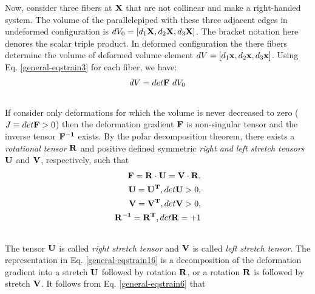 \documentclass[letterpaper,10pt,english]{sphinxmanual}
\begin{document}
Now, consider three fibers at ${\bf X}$ that are not collinear and make a right-handed system. The volume of the parallelepiped with these three adjacent edges in undeformed configuration is $dV_0=[d_1{\bf X}, d_2{\bf X}, d_3{\bf X}]$. The bracket notation here denores the scalar triple product. In deformed configuration the there fibers determine the volume of deformed volume element $dV=[d_1{\bf x}, d_2{\bf x}, d_3{\bf x}]$. Using Eq. \eqref{general-eqstrain3} for each fiber, we have:
\begin{gather}
\begin{split}dV = det{\bf F}~dV_0\end{split}\notag\\\begin{split}\end{split}\notag
\end{gather}
If consider only deformations for which the volume is never decreased to zero ($J \equiv det{\bf F} > 0$) then the deformation gradient ${\bf F}$ is non-singular tensor and the inverse tensor ${\bf F^{-1}}$ exists. By the polar decomposition theorem, there exists a \emph{rotational tensor} ${\bf R}$ and positive defined symmetric \emph{right and left stretch tensors} ${\bf U}$ and ${\bf V}$, respectively, such that
\label{general:equation-eqstrain16}\begin{gather}
\begin{split}\begin{split}
{\bf F} = {\bf R} \cdot {\bf U} = {\bf V} \cdot {\bf R}, \\
{\bf U} = {\bf U^T}, det{\bf U} > 0, \\
{\bf V} = {\bf V^T}, det{\bf V} > 0, \\
{\bf R^{-1}} = {\bf R^T}, det {\bf R} = +1
\end{split}\end{split}\label{general-eqstrain16}\\\begin{split}\end{split}\notag
\end{gather}
The tensor ${\bf U}$ is called \emph{right stretch tensor} and ${\bf V}$ is called \emph{left stretch tensor}. The representation in Eq. \eqref{general-eqstrain16} is a decomposition of the deformation gradient into a stretch ${\bf U}$ followed by rotation ${\bf R}$, or a rotation ${\bf R}$ is followed by stretch ${\bf V}$. It follows from Eq. \eqref{general-eqstrain6} that
\end{document}
